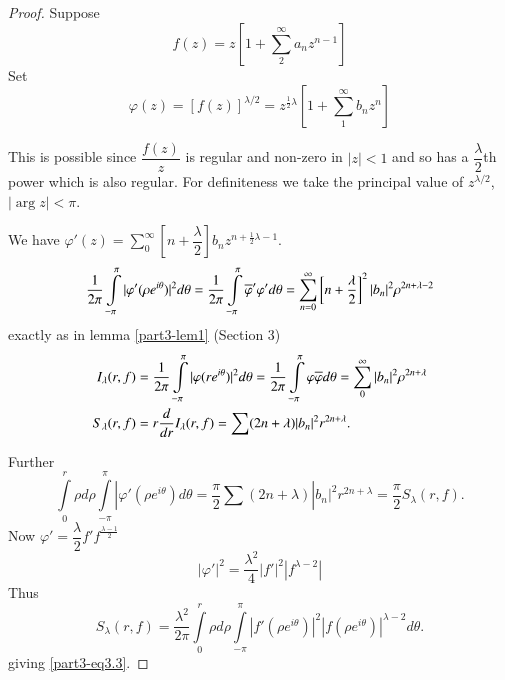 \begin{proof}
Suppose 
$$
f(z)=z\left[1+\sum^{\infty}_{2}a_{n}z^{n-1}\right]
$$
Set
$$
\varphi(z)=[f(z)]^{\lambda/2}=z^{\frac{1}{2}\lambda}\left[1+\sum^{\infty}_{1}b_{n}z^{n}\right]
$$

This is possible since $\dfrac{f(z)}{z}$ is regular and non-zero in
$|z|<1$ and so has a $\dfrac{\lambda}{2}$th power which is also
regular. For definiteness we take the principal value of
$z^{\lambda/2}$, $|\arg z|<\pi$.

We have
$\varphi'(z)=\sum\limits^{\infty}_{0}
\left[n+\dfrac{\lambda}{2}\right]b_{n}z^{n+\frac{1}{2}\lambda-1}$.  
$$
\frac{1}{2\pi}\int\limits^{\pi}_{-\pi}|\varphi'(\rho
e^{i\theta})|^{2}d\theta
=\frac{1}{2\pi}\int\limits^{\pi}_{-\pi}\overline{\varphi}'\varphi'
d\theta=\sum^{\infty}_{n=0}\left[n+\frac{\lambda}{2}\right]^{2}
|b_{n}|^{2}\rho^{2n+\lambda-2} 
$$
exactly as in lemma \ref{part3-lem1} (Section  3)
\begin{align*}
I_{\lambda}(r,f) &=
\frac{1}{2\pi}\int\limits^{\pi}_{-\pi}|\varphi(re^{i\theta})|^{2}d\theta=\frac{1}{2\pi}\int\limits^{\pi}_{-\pi}\varphi\overline{\varphi}d\theta=\sum^{\infty}_{0}|b_{n}|^{2}\rho^{2n+\lambda}\\
S_{\lambda}(r,f) &= r\frac{d}{dr}I_{\lambda}(r,f)=\sum
(2n+\lambda)|b_{n}|^{2}r^{2n+\lambda}. 
\end{align*}

Further\pageoriginale
$$
\int\limits^{r}_{0}\rho d\rho \int\limits^{\pi}_{-\pi}|\varphi'(\rho
e^{i\theta})d\theta=\frac{\pi}{2}\sum
(2n+\lambda)|b_{n}|^{2}r^{2n+\lambda}=\frac{\pi}{2}S_{\lambda}(r,f).
$$
Now $\varphi'=\dfrac{\lambda}{2}f'f^{\frac{\lambda-1}{2}}$
$$
|\varphi'|^{2}=\frac{\lambda^{2}}{4}|f'|^{2}|f^{\lambda-2}|
$$
Thus
$$
S_{\lambda}(r,f)=\frac{\lambda^{2}}{2\pi}\int\limits^{r}_{0}\rho d\rho
\int\limits^{\pi}_{-\pi}|f'(\rho e^{i\theta})|^{2}|f(\rho
e^{i\theta})|^{\lambda-2}d\theta.
$$
giving \eqref{part3-eq3.3}.


\end{proof}
